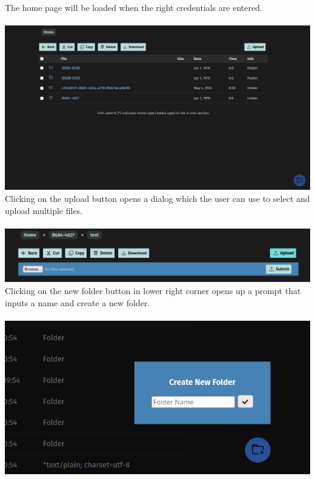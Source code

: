 \documentclass[12pt]{article}
\begin{document}
The home page will be loaded when the right credentials are entered. \\ \\
\includegraphics[width=\linewidth]{ss/2.cm-home.png} \\

Clicking on the upload button opens a dialog which the user can use to select and upload multiple files. \\ \\
\includegraphics[width=\linewidth]{ss/3.cm-upload.png} \\

Clicking on the new folder button in lower right corner opens up a prompt that inputs a name and create a new folder. \\ \\
\includegraphics[width=\linewidth]{ss/4.cm-create-folder.png} \\
\end{document}
